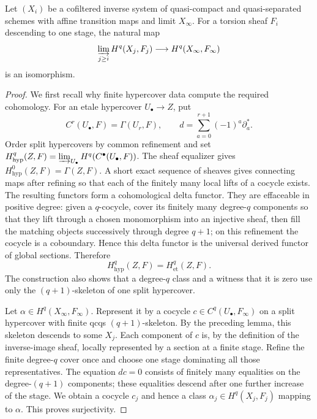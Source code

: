 \begin{lemma}
\label{lemma:weil-pbc-etale-cohomology-continuity}
\uses{}

Let $(X_i)$ be a cofiltered inverse system of quasi-compact and
quasi-separated schemes with affine transition maps and limit $X_\infty$.
For a torsion sheaf $F_i$ descending to one stage, the natural map
\[
 \varinjlim_{j\geq i}H^q(X_j,F_j)\longrightarrow
 H^q(X_\infty,F_\infty)
\]
is an isomorphism.
\end{lemma}
\begin{proof}

We first recall why finite hypercover data compute the required cohomology.
For an etale hypercover $U_\bullet\to Z$, put
\[
 C^r(U_\bullet,F)=\Gamma(U_r,F),\qquad
 d=\sum_{a=0}^{r+1}(-1)^a\partial_a^*.
\]
Order split hypercovers by common refinement and set
\(H^q_{\mathrm{hyp}}(Z,F)=
\varinjlim_{U_\bullet}H^q(C^\bullet(U_\bullet,F))\).
The sheaf equalizer gives $H^0_{\mathrm{hyp}}(Z,F)=\Gamma(Z,F)$.  A short
exact sequence of sheaves gives connecting maps after refining so that each
of the finitely many local lifts of a cocycle exists.  The resulting functors
form a cohomological delta functor.  They are effaceable in positive degree:
given a $q$-cocycle, cover its finitely many degree-$q$ components so that
they lift through a chosen monomorphism into an injective sheaf, then fill the
matching objects successively through degree $q+1$; on this refinement the
cocycle is a coboundary.  Hence this delta functor is the universal derived
functor of global sections.  Therefore
\[
 H^q_{\mathrm{hyp}}(Z,F)=H^q_{\mathrm{et}}(Z,F).
\]
The construction also shows that a degree-$q$ class and a witness that it is
zero use only the $(q+1)$-skeleton of one split hypercover.

Let $\alpha\in H^q(X_\infty,F_\infty)$.  Represent it by a cocycle
$c\in C^q(U_\bullet,F_\infty)$ on a split hypercover with finite qcqs
$(q+1)$-skeleton.  By the preceding lemma, this skeleton descends to some
$X_j$.  Each component of $c$ is, by the definition of the inverse-image
sheaf, locally represented by a section at a finite stage.  Refine the finite
degree-$q$ cover once and choose one stage dominating all those
representatives.  The equation $dc=0$ consists of finitely many equalities on
the degree-$(q+1)$ components; these equalities descend after one further
increase of the stage.  We obtain a cocycle $c_j$ and hence a class
$\alpha_j\in H^q(X_j,F_j)$ mapping to $\alpha$.  This proves surjectivity.


\end{proof}

